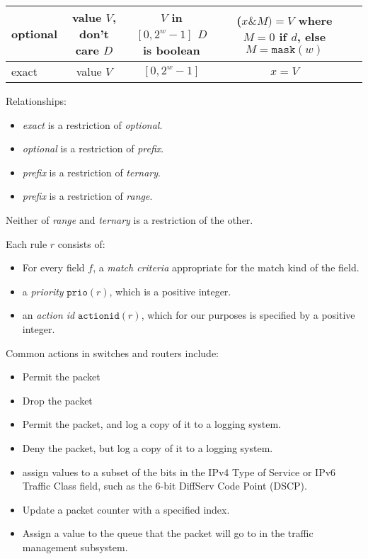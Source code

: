 \documentclass[acmsmall]{acmart}
\newcommand*\BitAnd{\mathbin{\&}}
\newcommand{\prio}[1]{}
\renewcommand{\prio}[1]{\ensuremath{\mathtt{prio}({#1})}}
\newcommand{\actionid}[1]{}
\renewcommand{\actionid}[1]{\ensuremath{\mathtt{actionid}({#1})}}
\newcommand{\fullmask}[1]{}
\renewcommand{\fullmask}[1]{\ensuremath{\mathtt{mask}({#1})}}
\begin{document}
\begin{table*}
\begin{tabular}{lcccl}
    \midrule
      optional
    & \makecell{value $V$, \\ don't care $D$}
    & \makecell{$V$ in $[0, 2^w-1]$ \\ $D$ is boolean}
    & \makecell{($x \BitAnd M) = V$ \\ where $M=0$ if $d$, \\ else $M=\fullmask{w}$}
    &
    \\

    \midrule
      exact
    & value $V$
    & $[0, 2^w-1]$
    & $x = V$
    &
    \\

  \bottomrule
\end{tabular}
\end{table*}

Relationships:
\begin{itemize}
\item {\em exact} is a restriction of {\em optional}.
\item {\em optional} is a restriction of {\em prefix}.
\item {\em prefix} is a restriction of {\em ternary}.
\item {\em prefix} is a restriction of {\em range}.
\end{itemize}
Neither of {\em range} and {\em ternary} is a restriction of the other.

\begin{definition}[rule]
\label{defn:rule}
Each rule $r$ consists of:
\begin{itemize}
\item For every field $f$, a {\em match criteria} appropriate for the match kind
  of the field.
\item a {\em priority} $\prio{r}$, which is a positive integer.
\item an {\em action id} $\actionid{r}$, which for our purposes is specified by a positive integer.
\end{itemize}
\end{definition}

Common actions in switches and routers include:
\begin{itemize}
\item Permit the packet
\item Drop the packet
\item Permit the packet, and log a copy of it to a logging system.
\item Deny the packet, but log a copy of it to a logging system.
\item assign values to a subset of the bits in the IPv4 Type of Service
or IPv6 Traffic Class field, such as the 6-bit DiffServ Code Point (DSCP).
\item Update a packet counter with a specified index.
\item Assign a value to the queue that the packet will go to in the traffic management subsystem.
\end{itemize}
\end{document}
